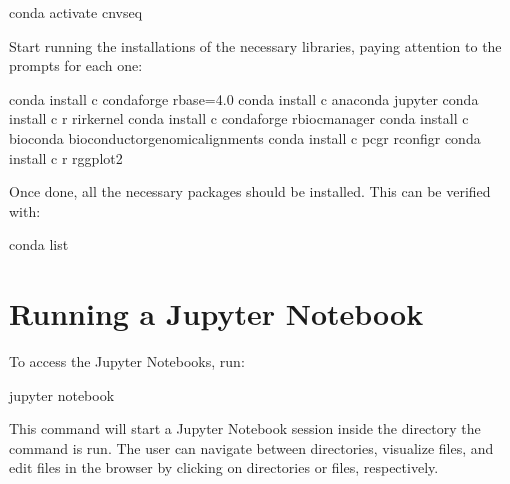 \documentclass[letterpaper,10pt,english]{sphinxhowto}
\begin{document}
\begin{sphinxVerbatim}[commandchars=\\\{\}]
\PYGZdl{} conda activate cnv\PYGZhy{}seq
\end{sphinxVerbatim}

\sphinxAtStartPar
Start running the installations of the necessary libraries, paying attention to the prompts for each one:

\begin{sphinxVerbatim}[commandchars=\\\{\}]
\PYGZdl{} conda install \PYGZhy{}c conda\PYGZhy{}forge r\PYGZhy{}base=4.0
\PYGZdl{} conda install \PYGZhy{}c anaconda jupyter
\PYGZdl{} conda install \PYGZhy{}c r r\PYGZhy{}irkernel
\PYGZdl{} conda install \PYGZhy{}c conda\PYGZhy{}forge r\PYGZhy{}biocmanager
\PYGZdl{} conda install \PYGZhy{}c bioconda bioconductor\PYGZhy{}genomicalignments
\PYGZdl{} conda install \PYGZhy{}c pcgr r\PYGZhy{}configr
\PYGZdl{} conda install \PYGZhy{}c r r\PYGZhy{}ggplot2
\end{sphinxVerbatim}

\sphinxAtStartPar
Once done, all the necessary packages should be installed. This can be verified with:

\begin{sphinxVerbatim}[commandchars=\\\{\}]
\PYGZdl{} conda list
\end{sphinxVerbatim}


\section{Running a Jupyter Notebook}
\label{\detokenize{index:running-a-jupyter-notebook}}
\sphinxAtStartPar
To access the Jupyter Notebooks, run:

\begin{sphinxVerbatim}[commandchars=\\\{\}]
\PYGZdl{} jupyter notebook
\end{sphinxVerbatim}

\sphinxAtStartPar
This command will start a Jupyter Notebook session inside the directory the command is run. The user can navigate between directories, visualize files, and edit files in the browser by clicking on directories or files, respectively.
\end{document}
